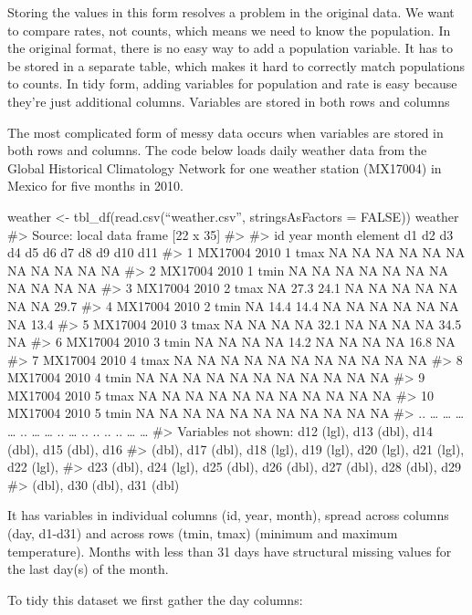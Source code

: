 \documentclass[]{article}
\begin{document}
Storing the values in this form resolves a problem in the original data.
We want to compare rates, not counts, which means we need to know the
population. In the original format, there is no easy way to add a
population variable. It has to be stored in a separate table, which
makes it hard to correctly match populations to counts. In tidy form,
adding variables for population and rate is easy because they're just
additional columns. Variables are stored in both rows and columns

The most complicated form of messy data occurs when variables are stored
in both rows and columns. The code below loads daily weather data from
the Global Historical Climatology Network for one weather station
(MX17004) in Mexico for five months in 2010.

weather \textless{}- tbl\_df(read.csv(``weather.csv'', stringsAsFactors
= FALSE)) weather \#\textgreater{} Source: local data frame {[}22 x
35{]} \#\textgreater{} \#\textgreater{} id year month element d1 d2 d3
d4 d5 d6 d7 d8 d9 d10 d11 \#\textgreater{} 1 MX17004 2010 1 tmax NA NA
NA NA NA NA NA NA NA NA NA \#\textgreater{} 2 MX17004 2010 1 tmin NA NA
NA NA NA NA NA NA NA NA NA \#\textgreater{} 3 MX17004 2010 2 tmax NA
27.3 24.1 NA NA NA NA NA NA NA 29.7 \#\textgreater{} 4 MX17004 2010 2
tmin NA 14.4 14.4 NA NA NA NA NA NA NA 13.4 \#\textgreater{} 5 MX17004
2010 3 tmax NA NA NA NA 32.1 NA NA NA NA 34.5 NA \#\textgreater{} 6
MX17004 2010 3 tmin NA NA NA NA 14.2 NA NA NA NA 16.8 NA
\#\textgreater{} 7 MX17004 2010 4 tmax NA NA NA NA NA NA NA NA NA NA NA
\#\textgreater{} 8 MX17004 2010 4 tmin NA NA NA NA NA NA NA NA NA NA NA
\#\textgreater{} 9 MX17004 2010 5 tmax NA NA NA NA NA NA NA NA NA NA NA
\#\textgreater{} 10 MX17004 2010 5 tmin NA NA NA NA NA NA NA NA NA NA NA
\#\textgreater{} .. \ldots{} \ldots{} \ldots{} \ldots{} .. \ldots{}
\ldots{} .. \ldots{} .. .. .. .. \ldots{} \ldots{} \#\textgreater{}
Variables not shown: d12 (lgl), d13 (dbl), d14 (dbl), d15 (dbl), d16
\#\textgreater{} (dbl), d17 (dbl), d18 (lgl), d19 (lgl), d20 (lgl), d21
(lgl), d22 (lgl), \#\textgreater{} d23 (dbl), d24 (lgl), d25 (dbl), d26
(dbl), d27 (dbl), d28 (dbl), d29 \#\textgreater{} (dbl), d30 (dbl), d31
(dbl)

It has variables in individual columns (id, year, month), spread across
columns (day, d1-d31) and across rows (tmin, tmax) (minimum and maximum
temperature). Months with less than 31 days have structural missing
values for the last day(s) of the month.

To tidy this dataset we first gather the day columns:
\end{document}
